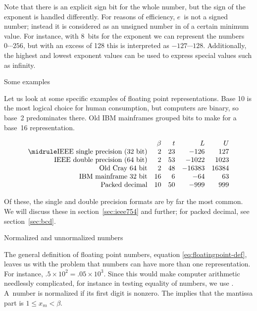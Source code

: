 Note that there is an explicit sign bit for the whole number, but the sign
of the exponent is handled differently. 
For reasons of efficiency, $e$~is not a signed number; instead it is
considered as an unsigned number in  of a certain minimum
value. For instance, with 8~bits for the exponent we can represent
the numbers~$0\cdots 256$, but with an excess of 128 this is interpreted
as $-127\cdots 128$.
Additionally, the highest and lowest exponent values 
can be used to express special values such as infinity.


 {Some examples}

Let us look at some specific examples of floating point
representations. Base 10 is the most logical choice for human
consumption, but computers are binary, so base~2 predominates
there. Old IBM mainframes grouped bits to make for a base~16
representation.

\begin{equation}
\begin{array}{rrrrr}
  &\beta&t&L&U\\ \midrule
  \hbox{IEEE single precision (32 bit)}&2&23&-126&127\\
  \hbox{IEEE double precision (64 bit)}&2&53&-1022&1023\\
  \hbox{Old Cray 64 bit}&2&48&-16383&16384\\
  \hbox{IBM mainframe 32 bit}&16&6&-64&63\\
  \hbox{Packed decimal}&10&50&-999&999\\
\end{array}
\end{equation}

Of these, the single and double precision formats are by far the most
common. We will discuss these in section~\ref{sec:ieee754} and
further; for packed decimal, see section~\ref{sec:bcd}.


 {Normalized and unnormalized numbers}
\label{sec:normal-unnormal}

The general definition of floating point numbers,
equation \eqref{eq:floatingpoint-def}, leaves us with the problem that numbers
can have more than one representation. For instance,
$.5\times10^{2}=.05\times 10^3$. Since this would make computer
arithmetic needlessly complicated, for instance in testing equality of
numbers, we use . A~number is normalized if its first digit is nonzero.
The implies that the mantissa part is $1\leq x_m <\beta$.

